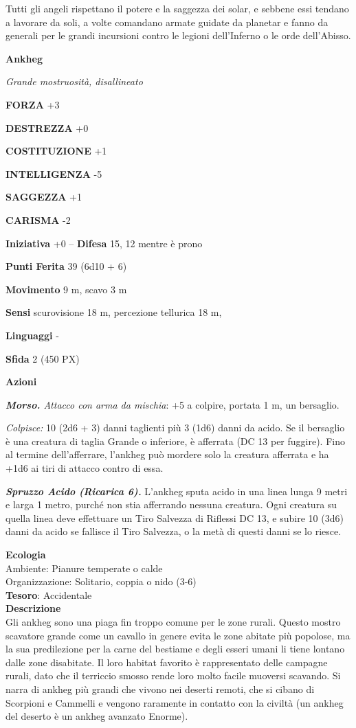 \begin{multicols}{2}
Tutti gli angeli rispettano il potere e la saggezza dei solar, e sebbene essi tendano a lavorare da soli, a volte comandano armate guidate da planetar e fanno da generali per le grandi incursioni contro le legioni dell'Inferno o le orde dell'Abisso.

\medskip{}\textbf{Ankheg}

\textit{Grande mostruosità, disallineato}

\textbf{FORZA} +3

\textbf{DESTREZZA} +0

\textbf{COSTITUZIONE} +1

\textbf{INTELLIGENZA} -5

\textbf{SAGGEZZA} +1

\textbf{CARISMA} -2

\textbf{Iniziativa} +0 -- \textbf{Difesa} 15, 12 mentre è prono

\textbf{Punti Ferita} 39 (6d10 + 6)

\textbf{Movimento} 9 m, scavo 3 m

\textbf{Sensi} scurovisione 18 m, percezione tellurica 18 m,

\textbf{Linguaggi} -

\textbf{Sfida} 2 (450 PX)

\textbf{Azioni}

\textit{\textbf{Morso.} Attacco con arma da mischia}: +5 a colpire, portata 1 m, un bersaglio.

\textit{Colpisce:} 10 (2d6 + 3) danni taglienti più 3 (1d6) danni da acido. Se il bersaglio è una creatura di taglia Grande o inferiore, è afferrata (DC 13 per fuggire). Fino al termine dell'afferrare, l'ankheg può mordere solo la creatura afferrata e ha +1d6 ai tiri di attacco contro di essa.

\textit{\textbf{Spruzzo Acido (Ricarica 6).}} L'ankheg sputa acido in una linea lunga 9 metri e larga 1 metro, purché non stia afferrando nessuna creatura. Ogni creatura su quella linea deve effettuare un Tiro Salvezza di Riflessi DC 13, e subire 10 (3d6) danni da acido se fallisce il Tiro Salvezza, o la metà di questi danni se lo riesce.

\textbf{Ecologia}\\
Ambiente: Pianure temperate o calde\\
Organizzazione: Solitario, coppia o nido (3-6)\\
\textbf{Tesoro}: Accidentale\\
\textbf{Descrizione}\\
Gli ankheg sono una piaga fin troppo comune per le zone rurali. Questo mostro scavatore grande come un cavallo in genere evita le zone abitate più popolose, ma la sua predilezione per la carne del bestiame e degli esseri umani li tiene lontano dalle zone disabitate. Il loro habitat favorito è rappresentato delle campagne rurali, dato che il terriccio smosso rende loro molto facile muoversi scavando. Si narra di ankheg più grandi che vivono nei deserti remoti, che si cibano di Scorpioni e Cammelli e vengono raramente in contatto con la civiltà (un ankheg del deserto è un ankheg avanzato Enorme).


\end{multicols}
